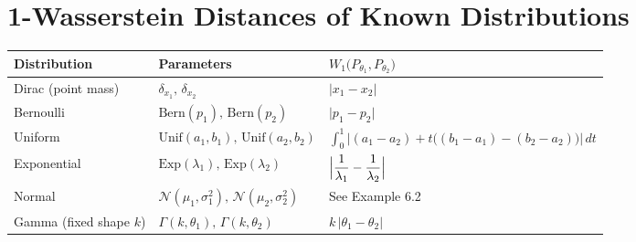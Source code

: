 \documentclass[11pt,a4paper]{article}
\theoremstyle{remark}
\begin{document}
\section{1-Wasserstein Distances of Known Distributions}

\begin{table}[htbp]
\centering
\begin{tabular}{lll}
\hline
\textbf{Distribution} & \textbf{Parameters} & \(\displaystyle W_{1}\bigl(P_{\theta_{1}},P_{\theta_{2}}\bigr)\) \\ 
\hline
Dirac (point mass) & \(\delta_{x_{1}},\,\delta_{x_{2}}\) &
\(\lvert x_{1}-x_{2}\rvert\) \\[1ex]

Bernoulli & \(\mathrm{Bern}(p_{1}),\,\mathrm{Bern}(p_{2})\) &
\(\lvert p_{1}-p_{2}\rvert\) \\[1ex]

Uniform & \(\mathrm{Unif}(a_{1},b_{1}),\,\mathrm{Unif}(a_{2},b_{2})\) &
\(\displaystyle \int_{0}^{1} \bigl\lvert (a_{1}-a_{2})
+ t\bigl((b_{1}-a_{1})-(b_{2}-a_{2})\bigr) \bigr\rvert\, dt\) \\[2ex]

Exponential & \(\mathrm{Exp}(\lambda_{1}),\,\mathrm{Exp}(\lambda_{2})\) &
\(\displaystyle \Bigl\lvert\dfrac{1}{\lambda_{1}}-\dfrac{1}{\lambda_{2}}\Bigr\rvert\) \\[1ex]

Normal & \(\mathcal{N}(\mu_{1},\sigma_{1}^{2}),\,\mathcal{N}(\mu_{2},\sigma_{2}^{2})\) &
See Example 6.2 \\[1ex]

Gamma (fixed shape \(k\)) & \(\Gamma(k,\theta_{1}),\,\Gamma(k,\theta_{2})\) &
\(k\,\lvert\theta_{1}-\theta_{2}\rvert\) \\[1ex]
\hline
\end{tabular}
\label{tab:wasserstein1_univariate}
\end{table}
\end{document}
